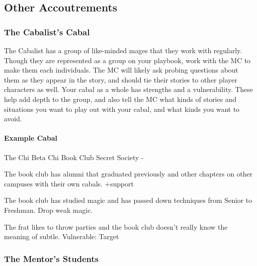 \documentclass[
  oneside,
  statementpaper,
  9pt]{memoir}
\begin{document}
\hypertarget{other-accoutrements}{%
\subsection{Other Accoutrements}\label{other-accoutrements}}

\hypertarget{the-cabalists-cabal}{%
\subsubsection{The Cabalist's Cabal}\label{the-cabalists-cabal}}

\begin{Player}

The Cabalist has a group of like-minded mages that they work with regularly. Though they are represented as a group on your playbook, work with the MC to make them each individuals. The MC will likely ask probing questions about them as they appear in the story, and should tie their stories to other player characters as well. Your cabal as a whole has strengths and a vulnerability. These help add depth to the group, and also tell the MC what kinds of stories and situations you want to play out with your cabal, and what kinds you want to avoid. 

\end{Player}

\hypertarget{example-cabal}{%
\paragraph{Example Cabal}\label{example-cabal}}

\begin{Player}

The Chi Beta Chi Book Club Secret Society - 

The book club has alumni that graduated previously and other chapters on other campuses with their own cabals. +support

The book club has studied magic and has passed down techniques from Senior to Freshman. Drop weak magic.

The frat likes to throw parties and the book club doesn’t really know the meaning of subtle. Vulnerable: Target

\end{Player}

\hypertarget{the-mentors-students}{%
\subsubsection{The Mentor's Students}\label{the-mentors-students}}
\end{document}
